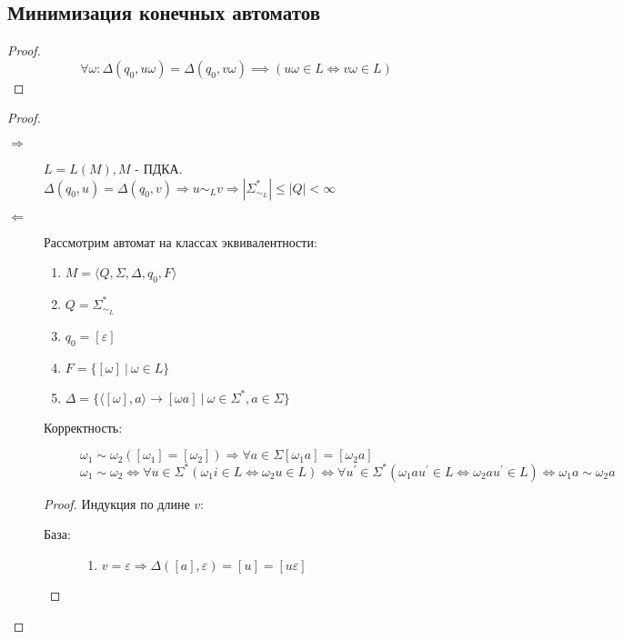 \documentclass[11pt,a4paper]{article}
\theoremstyle{definition}
\theoremstyle{definition}
\theoremstyle{definition}
\begin{document}
\subsection{Минимизация конечных автоматов}
\begin{proof}
\[
\forall \omega:\Delta(q_0, u\omega) = \Delta(q_0, v\omega)\implies(u\omega\in L\Leftrightarrow v\omega\in L)
\]
\end{proof}
\begin{proof}
\begin{description}
\item[$\Rightarrow$]{$L = L(M), M$ - ПДКА.
$
\Delta(q_0, u) = \Delta(q_0, v) \Rightarrow u\sim_L v \Rightarrow \left|\Sigma^*_{\sim_L}\right| \leq \left|Q\right|<\infty
$}
\item[$\Leftarrow$]{Рассмотрим автомат на классах эквивалентности:
\begin{enumerate}[1)]
\item{$M = \langle Q, \Sigma, \Delta, q_0, F\rangle$}
\item{$Q = \Sigma^*_{\sim_L}$}
\item{$q_0 = [\varepsilon]$}
\item{$F = \{[\omega]~|~\omega\in L\}$}
\item{$\Delta = \{\langle [\omega], a\rangle\rightarrow[\omega a]~|~\omega\in\Sigma^*, a\in \Sigma\}$}
\end{enumerate}
\begin{description}
\item[Корректность:]{$\omega_1\sim\omega_2 ([\omega_1]=[\omega_2])\Rightarrow \forall a\in\Sigma [\omega_1 a]=[\omega_2 a]$
\[
\omega_1\sim\omega_2\Leftrightarrow\forall u\in\Sigma^* (\omega_1 i\in L \Leftrightarrow\omega_2 u\in L)\Leftrightarrow \forall u^\prime\in\Sigma^* (\omega_1 a  u^\prime\in L \Leftrightarrow \omega_2 a u^\prime\in L)\Leftrightarrow \omega_1 a \sim\omega_2 a
\]}
\end{description}
\begin{proof}
Индукция по длине $v$:
\begin{description}
\item[База:]{
\begin{enumerate}
\item{$v=\varepsilon\Rightarrow \Delta([a],\varepsilon) = [u]=[u\varepsilon]$}

\end{enumerate}}
\end{description}
\end{proof}}
\end{description}
\end{proof}
\end{document}
